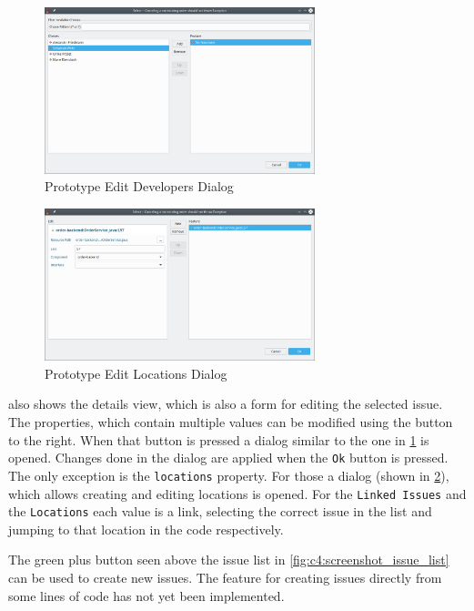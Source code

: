 \begin{figure}[!h]
	\centering
	\includegraphics[width=0.7\textwidth]{graphics/screenshot_gropius_ei_edit_list.png}
	\caption{Prototype Edit Developers Dialog}
	\label{fig:c4:screenshot_edit_list}
\end{figure}

\begin{figure}[!h]
	\centering
	\includegraphics[width=0.7\textwidth]{graphics/screenshot_gropius_ei_edit_locations.png}
	\caption{Prototype Edit Locations Dialog}
	\label{fig:c4:screenshot_edit_locations}
\end{figure}

 also shows the details view, which is also a form for editing the selected issue.
The properties, which contain multiple values can be modified using the button to the right.
When that button is pressed a dialog similar to the one in \cref{fig:c4:screenshot_edit_list} is opened.
Changes done in the dialog are applied when the \lstinline|Ok| button is pressed.
The only exception is the \lstinline|locations| property.
For those a dialog (shown in \cref{fig:c4:screenshot_edit_locations}), which allows creating and editing locations is opened.
For the \lstinline|Linked Issues| and the \lstinline|Locations| each value is a link, 
selecting the correct issue in the list and jumping to that location in the code respectively.

The green plus button seen above the issue list in \cref{fig:c4:screenshot_issue_list} can be used to create new issues.
The feature for creating issues directly from some lines of code has not yet been implemented.
